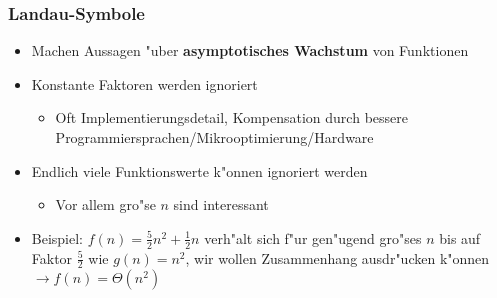 \documentclass[t]{beamer}
\begin{document}
\begin{frame}
  \frametitle{Landau-Symbole}
  \begin{itemize}
  \item Machen Aussagen "uber \textbf{asymptotisches Wachstum} von Funktionen
  \item Konstante Faktoren werden ignoriert
    \begin{itemize}
    \item Oft Implementierungsdetail, Kompensation durch
          bessere Programmiersprachen/Mikrooptimierung/Hardware
    \end{itemize}
  \item Endlich viele Funktionswerte k"onnen ignoriert werden
    \begin{itemize}
    \item Vor allem gro"se $n$ sind interessant
    \end{itemize}
  \item Beispiel: $f(n) = \frac{5}{2}n^2 + \frac{1}{2}n$ verh"alt sich f"ur gen"ugend gro"ses
        $n$ bis auf Faktor $\frac{5}{2}$ wie $g(n) = n^2$, wir wollen
        Zusammenhang ausdr"ucken k"onnen \\[1em]
          $\rightarrow f(n) = \Theta(n^2)$
  \end{itemize}
\end{frame}
\end{document}
